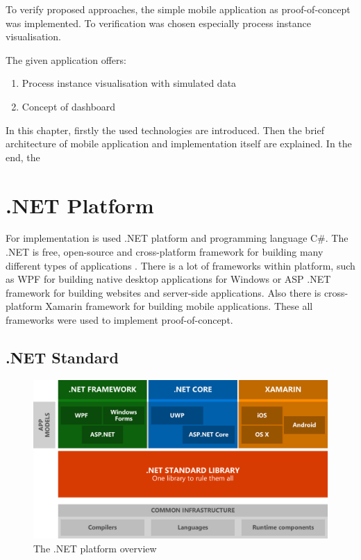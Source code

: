 To verify proposed approaches, the simple mobile application as proof-of-concept was implemented. To verification was chosen especially process instance visualisation.

The given application offers:
\begin{enumerate}
\item Process instance visualisation with simulated data
\item Concept of dashboard
\end{enumerate}

In this chapter, firstly the used technologies are introduced. Then the brief architecture of mobile application and implementation itself are explained. In the end, the
\section{.NET Platform}

For implementation is used .NET platform and programming language C\#. The .NET is free, open-source and cross-platform framework for building many different types of applications \cite{what-is-dotnet}. There is a lot of frameworks within platform, such as WPF for building native desktop applications for Windows or ASP .NET framework for building websites and server-side applications. Also there is cross-platform Xamarin framework for building mobile applications. These all frameworks were used to implement proof-of-concept. 
\subsection{.NET Standard}
\begin{figure}[ht!]
\centering
\includegraphics[width=12cm,keepaspectratio]{img/dotnet-overview}
\caption{The .NET platform overview \cite{introducing-dotnet-standard}}
\label{fig:dotnet-overview}
\end{figure}

